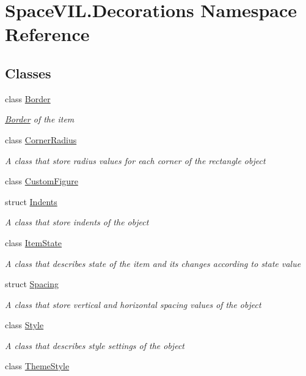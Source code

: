 \hypertarget{namespace_space_v_i_l_1_1_decorations}{}\section{Space\+V\+I\+L.\+Decorations Namespace Reference}
\label{namespace_space_v_i_l_1_1_decorations}
\subsection*{Classes}
\begin{DoxyCompactItemize}
\item 
class \mbox{\hyperlink{class_space_v_i_l_1_1_decorations_1_1_border}{Border}}
\begin{DoxyCompactList}\small\item\em \mbox{\hyperlink{class_space_v_i_l_1_1_decorations_1_1_border}{Border}} of the item \end{DoxyCompactList}\item 
class \mbox{\hyperlink{class_space_v_i_l_1_1_decorations_1_1_corner_radius}{Corner\+Radius}}
\begin{DoxyCompactList}\small\item\em A class that store radius values for each corner of the rectangle object \end{DoxyCompactList}\item 
class \mbox{\hyperlink{class_space_v_i_l_1_1_decorations_1_1_custom_figure}{Custom\+Figure}}
\item 
struct \mbox{\hyperlink{struct_space_v_i_l_1_1_decorations_1_1_indents}{Indents}}
\begin{DoxyCompactList}\small\item\em A class that store indents of the object \end{DoxyCompactList}\item 
class \mbox{\hyperlink{class_space_v_i_l_1_1_decorations_1_1_item_state}{Item\+State}}
\begin{DoxyCompactList}\small\item\em A class that describes state of the item and its changes according to state value \end{DoxyCompactList}\item 
struct \mbox{\hyperlink{struct_space_v_i_l_1_1_decorations_1_1_spacing}{Spacing}}
\begin{DoxyCompactList}\small\item\em A class that store vertical and horizontal spacing values of the object \end{DoxyCompactList}\item 
class \mbox{\hyperlink{class_space_v_i_l_1_1_decorations_1_1_style}{Style}}
\begin{DoxyCompactList}\small\item\em A class that describes style settings of the object \end{DoxyCompactList}\item 
class \mbox{\hyperlink{class_space_v_i_l_1_1_decorations_1_1_theme_style}{Theme\+Style}}
\end{DoxyCompactItemize}
